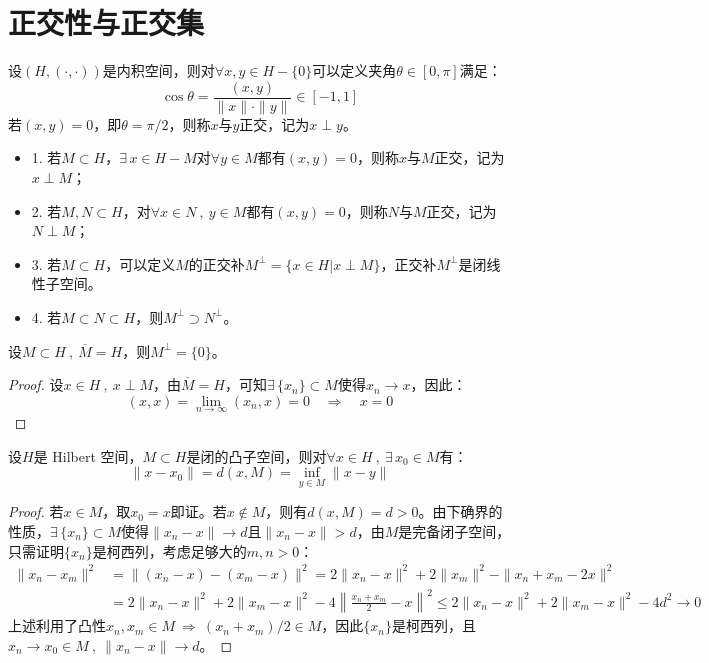 \section{正交性与正交集}\label{zj}
\begin{definition}[正交]
设$(H,(\cdot,\cdot))$是内积空间，则对$\forall x,y \in H-\{0\}$可以定义夹角$\theta\in[0,\pi]$满足：
\[\cos\theta=\frac{(x,y)}{\|x\|\cdot\|y\|}\in[-1,1]\]
若$(x,y)=0$，即$\theta=\pi/2$，则称$x$与$y$正交，记为$x \perp y$。
\end{definition}
\begin{itemize}\label{itemize:zjbb}
\item 1. 若$M \subset H$，$\exists \, x \in H-M$对$\forall y \in M$都有$(x,y)=0$，则称$x$与$M$正交，记为$x \perp M$；
\item 2. 若$M,N \subset H$，对$\forall x \in N \ , \ y \in M$都有$(x,y)=0$，则称$N$与$M$正交，记为$N \perp M$；
\item 3. 若$M \subset H$，可以定义$M$的正交补$M^{\perp}=\{x \in H|x \perp M\}$，正交补$M^{\perp}$是闭线性子空间。
\item 4. 若$M \subset N \subset H$，则$M^{\perp} \supset N^{\perp}$。
\end{itemize}

\begin{proposition}
设$M \subset H \ , \ \overline{M}=H$，则$M^{\perp}=\{0\}$。
\end{proposition}
\begin{proof}
设$x \in H \ , \ x \perp M$，由$\overline{M}=H$，可知$\exists \, \{x_n\} \subset M$使得$x_n \to x$，因此：
\[(x,x)=\lim_{n \to \infty}(x_n,x)=0 \quad \Rightarrow \quad x=0\]
\end{proof}

\begin{theorem}
设$H$是 Hilbert 空间，$M \subset H$是闭的凸子空间，则对$\forall x \in H \ , \ \exists \, x_0 \in M$有：
\[\|x-x_0\|=d(x,M)=\inf_{y \in M}\|x-y\|\]
\end{theorem}
\begin{proof}
若$x \in M$，取$x_0=x$即证。若$x \notin M$，则有$d(x,M)=d>0$。由下确界的性质，$\exists \, \{x_n\} \subset M$使得$\|x_n-x\| \to d$且$\|x_n-x\|>d$，由$M$是完备闭子空间，只需证明$\{x_n\}$是柯西列，考虑足够大的$m,n>0$：
\[\begin{aligned}
\|x_n-x_m\|^2&=\|(x_n-x)-(x_m-x)\|^2=2\|x_n-x\|^2+2\|x_m\|^2-\|x_n+x_m-2x\|^2\\
&=2\|x_n-x\|^2+2\|x_m-x\|^2-4\left\|\frac{x_n+x_m}{2}-x\right\|^2
\leq 2\|x_n-x\|^2+2\|x_m-x\|^2-4d^2 \to 0
\end{aligned}\]
上述利用了凸性$x_n,x_m \in M \ \Rightarrow \ (x_n+x_m)/2 \in M$，因此$\{x_n\}$是柯西列，且$x_n \to x_0 \in M \ , \ \|x_n-x\| \to d$。
\end{proof}

